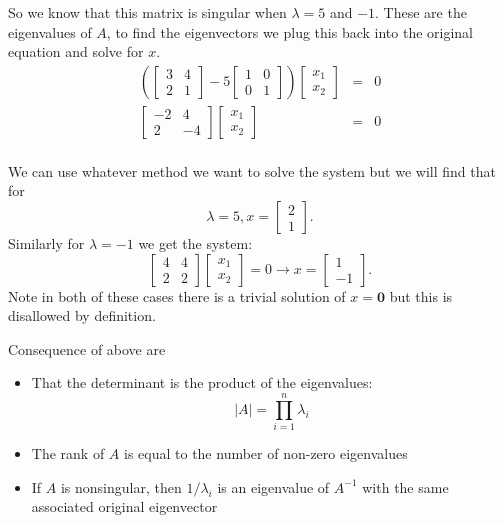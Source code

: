 So we know that this matrix is singular when $\lambda = 5$ and $-1$. 
These are the eigenvalues of $A$, to find the eigenvectors we plug this back into the original equation and solve for $x$. 
\[\begin{array}{rcl}
\left(\begin{bmatrix}3 & 4 \\ 2 & 1\end{bmatrix}-5\begin{bmatrix}1&0\\0&1\end{bmatrix}\right)\begin{bmatrix}x_1\\x_2\end{bmatrix} & = & 0\\
\begin{bmatrix}-2 & 4 \\ 2 & -4\end{bmatrix}\begin{bmatrix}x_1\\x_2\end{bmatrix} & = & 0\\
\end{array}\]

We can use whatever method we want to solve the system but we will find that for \[\lambda=5, x=\begin{bmatrix}2\\1\end{bmatrix}.\]
Similarly for $\lambda=-1$ we get the system:  
\[\begin{bmatrix}4 & 4 \\ 2 & 2\end{bmatrix}\begin{bmatrix}x_1\\x_2\end{bmatrix} = 0 \rightarrow x=\begin{bmatrix}1\\-1\end{bmatrix}.\]
Note in both of these cases there is a trivial solution of $x=\mathbf{0}$ but this is disallowed by definition. 

\begin{aside}
Consequence of above are 
\begin{itemize}
\item That the determinant is the product of the eigenvalues: \[|A|=\prod_{i=1}^n \lambda_i\]
\item The rank of $A$ is equal to the number of non-zero eigenvalues
\item If $A$ is nonsingular, then $1/\lambda_i$ is an eigenvalue of $A^{-1}$ with the same associated original eigenvector
\end{itemize}
\end{aside}

